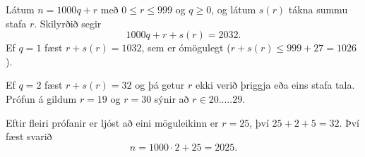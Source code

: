 Látum $n = 1000q + r$ með $0 \le r \le 999$ og $q \ge 0$, og
látum $s(r)$ tákna summu stafa $r$.
Skilyrðið segir
\[
1000q + r + s(r) = 2032.
\]
Ef $q=1$ fæst $r + s(r) = 1032$, sem er ómögulegt
($r + s(r) \le 999 + 27 = 1026$).

Ef $q=2$ fæst $r + s(r) = 32$ og þá getur $r$ ekki verið þriggja eða eins stafa tala. Prófun á gildum $r = 19$ og $r = 30$ sýnir að $r \in \qty{20, ..., 29}$.

Eftir fleiri prófanir er ljóst að eini möguleikinn er $r = 25$,
því $25 + 2 + 5 = 32$.
Því fæst svarið
\[
n = 1000 \cdot 2 + 25 = 2025.
\]